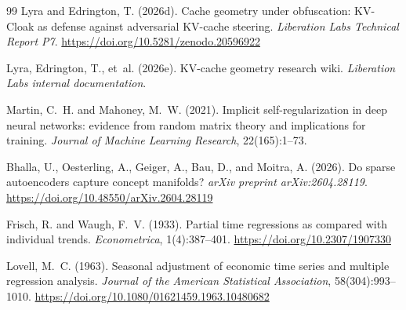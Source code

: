 \documentclass[11pt,a4paper]{article}
\begin{document}
\begin{thebibliography}{99}
Lyra and Edrington, T. (2026d).
Cache geometry under obfuscation: KV-Cloak as defense against
adversarial KV-cache steering.
\textit{Liberation Labs Technical Report P7}.
\url{https://doi.org/10.5281/zenodo.20596922}

Lyra, Edrington, T., et~al. (2026e).
KV-cache geometry research wiki.
\textit{Liberation Labs internal documentation}.

Martin, C.~H. and Mahoney, M.~W. (2021).
Implicit self-regularization in deep neural networks: evidence from
random matrix theory and implications for training.
\textit{Journal of Machine Learning Research}, 22(165):1--73.

Bhalla, U., Oesterling, A., Geiger, A., Bau, D., and Moitra, A. (2026).
Do sparse autoencoders capture concept manifolds?
\textit{arXiv preprint arXiv:2604.28119}.
\url{https://doi.org/10.48550/arXiv.2604.28119}

Frisch, R. and Waugh, F.~V. (1933).
Partial time regressions as compared with individual trends.
\textit{Econometrica}, 1(4):387--401.
\url{https://doi.org/10.2307/1907330}

Lovell, M.~C. (1963).
Seasonal adjustment of economic time series and multiple regression analysis.
\textit{Journal of the American Statistical Association}, 58(304):993--1010.
\url{https://doi.org/10.1080/01621459.1963.10480682}

\end{thebibliography}
\end{document}
